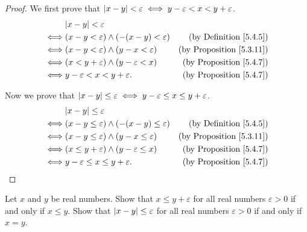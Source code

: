 \begin{proof}
We first prove that \(\abs*{x - y} < \varepsilon \iff y - \varepsilon < x < y + \varepsilon\).
\begin{align*}
& \abs*{x - y} < \varepsilon \\
\iff & (x - y < \varepsilon) \land (-(x - y) < \varepsilon) & \text{(by Definition \ref{5.4.5})} \\
\iff & (x - y < \varepsilon) \land (y - x < \varepsilon) & \text{(by Proposition \ref{5.3.11})} \\
\iff & (x < y + \varepsilon) \land (y - \varepsilon < x) & \text{(by Proposition \ref{5.4.7})} \\
\iff & y - \varepsilon < x < y + \varepsilon. & \text{(by Proposition \ref{5.4.7})}
\end{align*}

Now we prove that \(\abs*{x - y} \leq \varepsilon \iff y - \varepsilon \leq x \leq y + \varepsilon\).
\begin{align*}
& \abs*{x - y} \leq \varepsilon \\
\iff & (x - y \leq \varepsilon) \land (-(x - y) \leq \varepsilon) & \text{(by Definition \ref{5.4.5})} \\
\iff & (x - y \leq \varepsilon) \land (y - x \leq \varepsilon) & \text{(by Proposition \ref{5.3.11})} \\
\iff & (x \leq y + \varepsilon) \land (y - \varepsilon \leq x) & \text{(by Proposition \ref{5.4.7})} \\
\iff & y - \varepsilon \leq x \leq y + \varepsilon. & \text{(by Proposition \ref{5.4.7})}
\end{align*}
\end{proof}

\begin{exercise}\label{ex 5.4.7}
Let \(x\) and \(y\) be real numbers.
Show that \(x \leq y + \varepsilon\) for all real numbers \(\varepsilon > 0\) if and only if \(x \leq y\).
Show that \(\abs*{x - y} \leq \varepsilon\) for all real numbers \(\varepsilon > 0\) if and only if \(x = y\).
\end{exercise}

